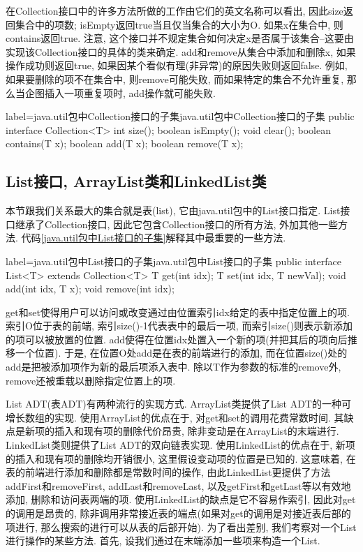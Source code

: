 \documentclass[oneside]{ctexbook}
\begin{document}
在Collection接口中的许多方法所做的工作由它们的英文名称可以看出, 因此size返回集合中的项数; isEmpty返回true当且仅当集合的大小为O. 如果x在集合中, 则contains返回true. 注意, 这个接口并不规定集合如何决定x是否属于该集合--这要由实现该Collection接口的具体的类来确定. add和remove从集合中添加和删除x, 如果操作成功则返回true, 如果因某个看似有理(非异常)的原因失败则返回false. 例如, 如果要删除的项不在集合中, 则remove可能失败, 而如果特定的集合不允许重复, 那么当企图插入一项重复项时, add操作就可能失败.

\begin{myjava}{label={java.util包中Collection接口的子集}}{java.util包中Collection接口的子集}
public interface Collection<T> {
    int size();
    boolean isEmpty();
    void clear();
    boolean contains(T x);
    boolean add(T x);
    boolean remove(T x);
}
\end{myjava}

\subsection{List接口, ArrayList类和LinkedList类}

本节跟我们关系最大的集合就是表(list), 它由java.util包中的List接口指定. List接口继承了Collection接口, 因此它包含Collection接口的所有方法, 外加其他一些方法. 代码\ref{java.util包中List接口的子集}解释其中最重要的一些方法.

\begin{myjava}{label={java.util包中List接口的子集}}{java.util包中List接口的子集}
public interface List<T> extends Collection<T> {
    T get(int idx);
    T set(int idx, T newVal);
    void add(int idx, T x);
    void remove(int idx);
}
\end{myjava}

get和set使得用户可以访问或改变通过由位置索引idx给定的表中指定位置上的项. 索引O位于表的前端, 索引size()-1代表表中的最后一项, 而索引size()则表示新添加的项可以被放置的位置. add使得在位置idx处置入一个新的项(并把其后的项向后推移一个位置). 于是, 在位置O处add是在表的前端进行的添加, 而在位置size()处的add是把被添加项作为新的最后项添入表中. 除以T作为参数的标准的remove外, remove还被重载以删除指定位置上的项.

List ADT(表ADT)有两种流行的实现方式. ArrayList类提供了List ADT的一种可增长数组的实现. 使用ArrayList的优点在于, 对get和set的调用花费常数时间. 其缺点是新项的插入和现有项的删除代价昂贵, 除非变动是在ArrayList的末端进行. LinkedList类则提供了List ADT的双向链表实现. 使用LinkedList的优点在于, 新项的插入和现有项的删除均开销很小, 这里假设变动项的位置是已知的. 这意味着, 在表的前端进行添加和删除都是常数时间的操作, 由此LinkedList更提供了方法addFirst和removeFirst, addLast和removeLast, 以及getFirst和getLast等以有效地添加, 删除和访问表两端的项. 使用LinkedList的缺点是它不容易作索引, 因此对get的调用是昂贵的, 除非调用非常接近表的端点(如果对get的调用是对接近表后部的项进行, 那么搜索的进行可以从表的后部开始). 为了看出差别, 我们考察对一个List进行操作的某些方法. 首先, 设我们通过在末端添加一些项来构造一个List.
\end{document}
